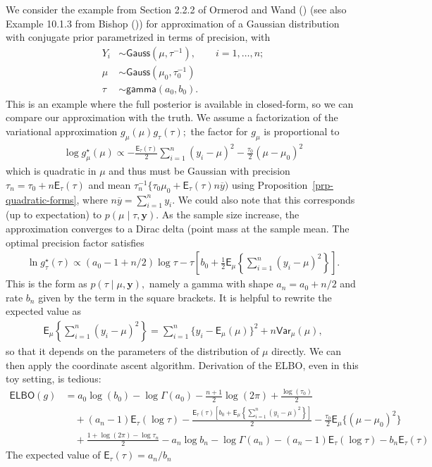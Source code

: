 \documentclass[
  11pt,
  letterpaper,
]{scrbook}
\theoremstyle{plain}
\theoremstyle{definition}
\theoremstyle{definition}
\theoremstyle{plain}
\theoremstyle{plain}
\theoremstyle{definition}
\theoremstyle{remark}
\begin{document}
We consider the example from Section 2.2.2 of Ormerod and Wand
() (see also Example 10.1.3 from
Bishop ()) for approximation of a
Gaussian distribution with conjugate prior parametrized in terms of
precision, with \begin{align*}
Y_i &\sim \mathsf{Gauss}(\mu, \tau^{-1}), \qquad i =1, \ldots, n;\\
\mu &\sim \mathsf{Gauss}(\mu_0, \tau_0^{-1}) \\
\tau &\sim \mathsf{gamma}(a_0, b_0).
\end{align*} This is an example where the full posterior is available in
closed-form, so we can compare our approximation with the truth. We
assume a factorization of the variational approximation
\(g_\mu(\mu)g_\tau(\tau);\) the factor for \(g_\mu\) is proportional to
\begin{align*}
 \log g^{\star}_\mu(\mu) \propto -\frac{\mathsf{E}_{\tau}(\tau)}{2} \sum_{i=1}^n (y_i-\mu)^2-\frac{\tau_0}{2}(\mu-\mu_0)^2
\end{align*} which is quadratic in \(\mu\) and thus must be Gaussian
with precision \(\tau_n = \tau_0 + n\mathsf{E}_{\tau}(\tau)\) and mean
\(\tau_n^{-1}\{\tau_0\mu_0 + \mathsf{E}_{\tau}(\tau)n\overline{y})\)
using Proposition~\ref{prp-quadratic-forms}, where
\(n\overline{y} = \sum_{i=1}^n y_i.\) We could also note that this
corresponds (up to expectation) to \(p(\mu \mid \tau, \boldsymbol{y}).\)
As the sample size increase, the approximation converges to a Dirac
delta (point mass at the sample mean. The optimal precision factor
satisfies \begin{align*}
 \ln g^{\star}_{\tau}(\tau) \propto (a_0-1 +n/2) \log \tau - \tau \left[b_0  + \frac{1}{2} \mathsf{E}_{\mu}\left\{\sum_{i=1}^n (y_i-\mu)^2\right\}\right].
\end{align*} This is the form as \(p(\tau \mid \mu, \boldsymbol{y}),\)
namely a gamma with shape \(a_n =a_0 +n/2\) and rate \(b_n\) given by
the term in the square brackets. It is helpful to rewrite the expected
value as \begin{align*}
 \mathsf{E}_{\mu}\left\{\sum_{i=1}^n (y_i-\mu)^2\right\} = \sum_{i=1}^n \{y_i - \mathsf{E}_{\mu}(\mu)\}^2 + n \mathsf{Var}_{\mu}(\mu),
\end{align*} so that it depends on the parameters of the distribution of
\(\mu\) directly. We can then apply the coordinate ascent algorithm.
Derivation of the ELBO, even in this toy setting, is tedious:
\begin{align*}
\mathsf{ELBO}(g) & = a_0\log(b_0)-\log \Gamma(a_0) - \frac{n+1}{2} \log(2\pi) + \frac{\log(\tau_0)}{2} \\&\quad+ (a_n-1)\mathsf{E}_{\tau}(\log \tau) -
\frac{ \mathsf{E}_{\tau}(\tau)\left[b_0 +\mathsf{E}_{\mu}\left\{\sum_{i=1}^n (y_i - \mu)^2\right\}\right]}{2} - \frac{\tau_0}{2} \mathsf{E}_{\mu}\{(\mu - \mu_0)^2\}\\& \quad + \frac{1+\log(2\pi)-\log\tau_n}{2} -a_n\log b_n - \log \Gamma(a_n) - (a_n-1)\mathsf{E}_{\tau}(\log \tau) -b_n \mathsf{E}_{\tau}(\tau)
\end{align*} The expected value of \(\mathsf{E}_{\tau}(\tau) = a_n/b_n\)
\end{document}
